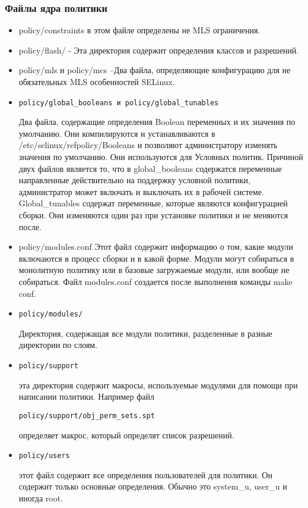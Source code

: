 \documentclass{./../class/UIR}
\begin{document}
	\subsubsection{Файлы ядра политики}
	
	\begin{itemize}
	  \item policy/constraints в этом файле определены не MLS
	  ограничения.
	  \item policy/flash/ - Эта директория содержит определения классов и
	  разрешений.
	  \item policy/mls и policy/mcs –Два файла, определяющие конфигурацию для не
	  обязательных MLS особенностей  SELinux.
	  \item \begin{verbatim}policy/global_booleans и policy/global_tunables\end{verbatim} 
	  Два файла, содержащие определения
	  Boolean переменных и их значения по умолчанию.
	  Они компилируются и устанавливаются в /etc/selinux/refpolicy/Booleans и позволяют
	  администратору изменять значения по умолчанию. Они используются 
	  для Условных политик. Причиной двух файлов является то, что в
	  global\_booleans содержатся переменные направленные действительно на
	  поддержку условной политики, администратор может включать и выключать их в рабочей системе.
	  Global\_tunables содержат переменные, которые являются конфигурацией сборки.
	  Они изменяются один раз при установке политики и не меняются после. 
	  \item  policy/modules.conf Этот файл содержит
	  информацию о том, какие модули включаются в процесс сборки и в какой форме. Модули могут собираться в монолитную 
	  политику или в базовые загружаемые модули, или вообще не собираться. Файл modules.conf 
	  создается после выполнения команды make conf.
	  \item \begin{verbatim}policy/modules/\end{verbatim} Директория, содержащая
	  все модули политики, разделенные в разные директории по слоям.  
	  \item \begin{verbatim}policy/support\end{verbatim} эта директория содержит 
	  макросы, используемые модулями для помощи при написании политики. Например
	  файл \begin{verbatim}policy/support/obj_perm_sets.spt\end{verbatim}
	  определяет макрос, который определят список разрешений.
	  \item \begin{verbatim}policy/users\end{verbatim} этот файл содержит все
	  определения пользователей для политики. Он содержит только основные определения. Обычно
	  это system\_u, user\_u и иногда root.
	\end{itemize}
	
\end{document}
